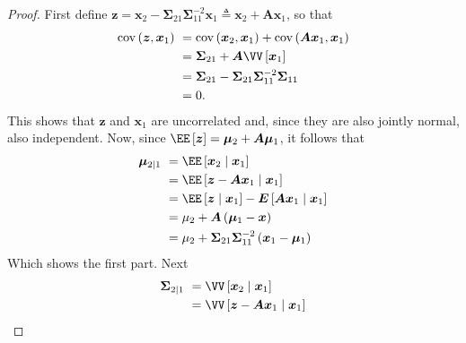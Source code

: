 \begin{proof}
    First define $\bm{z} = \bm{x}_2 - \bm{\Sigma}_{21} \bm{\Sigma}_{11}^{-2} \bm{x}_{1} \triangleq \bm{x}_2 + \bm{A} \bm{x}_{1}$, so that
    \begin{align*}
        \operatorname{cov} \left( \bm{z} , \bm{x}_{1} \right) \
         & = \operatorname{cov} \left( \bm{x}_2 , \bm{x}_1 \right) + \operatorname{cov} \left( \bm{A} \bm{x}_1 , \bm{x}_1 \right) \\
         & = \bm{\Sigma}_{21} + \bm{A} \VV \left[ \bm{x}_1 \right]                                                                \\
         & = \bm{\Sigma}_{21} - \bm{\Sigma}_{21} \bm{\Sigma}_{11}^{-2} \bm{\Sigma}_{11}                                           \\
         & = 0.
    \end{align*}
    This shows that $\bm{z}$ and $\bm{x}_1$ are uncorrelated and, since they are also jointly normal, also independent. Now, since $\EE \left[ \bm{z} \right] = \bm{\mu}_2 + \bm{A} \bm{\mu}_1$, it follows that
    \begin{align*}
        \bm{\mu}_{2 \mid 1} \
         & = \EE \left[ \bm{x}_2 \mid \bm{x}_1 \right]                                                     \\
         & = \EE \left[ \bm{z} - \bm{A} \bm{x}_1 \mid \bm{x}_1 \right]                                     \\
         & = \EE \left[ \bm{z} \mid \bm{x}_1 \right] - \bm{E} \left[ \bm{A} \bm{x}_1 \mid \bm{x}_1 \right] \\
         & = \mu_2 + \bm{A} \left( \bm{\mu}_1 - \bm{x} \right)                                             \\
         & = \mu_2 + \bm{\Sigma}_{21} \bm{\Sigma}_{11}^{-2} \left( \bm{x}_1 -\bm{\mu}_{1} \right)
    \end{align*}
    Which shows the first part. Next
    \begin{align*}
        \bm{\Sigma}_{2 \mid 1} \
         & = \VV \left[ \bm{x}_{2} \mid \bm{x}_{1} \right]                                                                                                                                                                                            \\
         & = \VV \left[ \bm{z} - \bm{A} \bm{x}_1 \mid \bm{x}_1 \right]                                                                                                                                                                                \\

\end{align*}
\end{proof}
